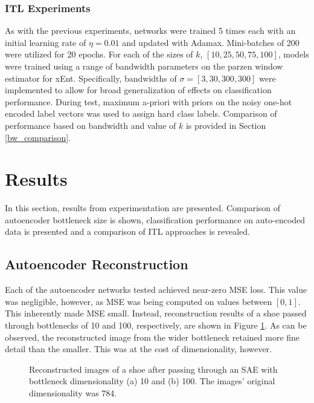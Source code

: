 \documentclass[conference]{IEEEtran}
\begin{document}
	 \subsubsection*{ITL Experiments}
	 As with the previous experiments, networks were trained 5 times each with an initial learning rate of $\eta=0.01$ and updated with Adamax.  Mini-batches of 200 were utilized for 20 epochs.  For each of the sizes of $k$, $[10,25,50,75,100]$, models were trained using a range of bandwidth parameters on the parzen window estimator for xEnt.  Specifically, bandwidths of $\sigma = [3,30,300,300]$ were implemented to allow for broad generalization of effects on classification performance. During test, maximum a-priori with priors on the noisy one-hot encoded label vectors was used to assign hard class labels. Comparison of performance based on bandwidth and value of $k$ is provided in Section \ref{bw_comparison}.
	 


\section{Results} \label{Results}
In this section, results from experimentation are presented.  Comparison of autoencoder bottleneck size is shown, classification performance on auto-encoded data is presented and a comparison of ITL approaches is revealed. 

\subsection{Autoencoder Reconstruction} \label{ae_reconstruction}
Each of the autoencoder  networks tested achieved near-zero MSE loss. This value was negligible, however, as MSE was being computed on values between $[0,1]$.  This inherently made MSE small.  Instead, reconstruction results of a shoe passed through bottlenecks of 10 and 100, respectively, are shown in Figure \ref{fig:ae_reconstruction}.  As can be observed, the reconstructed image from the wider bottleneck retained more fine detail than the smaller.  This was at the cost of dimensionality, however.

\begin{figure}%
	\centering
	\caption{Reconstructed images of a shoe after passing through an SAE with bottleneck dimensionality (a) 10 and (b) 100.  The images' original dimensionality was 784.}%
	\label{fig:ae_reconstruction}%
\end{figure}
\end{document}
